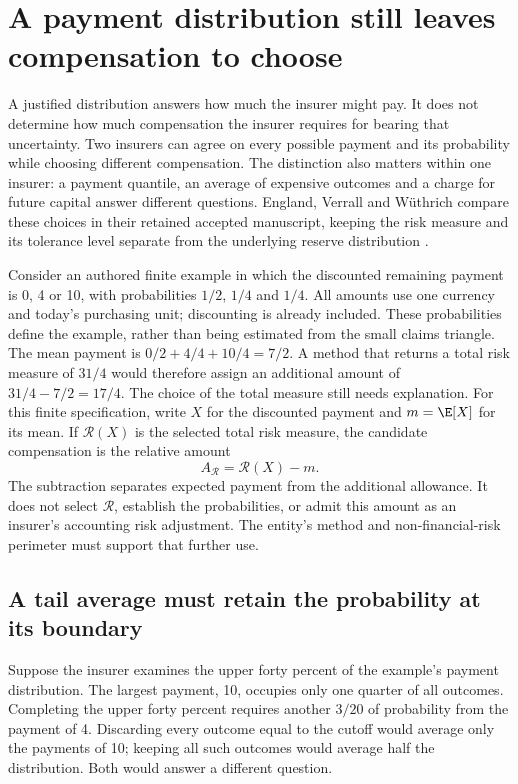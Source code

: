 \section{A payment distribution still leaves compensation to choose}
\label{sec:reserve-risk-measures}

A justified distribution answers how much the insurer might pay. It does not
determine how much compensation the insurer requires for bearing that
uncertainty. Two insurers can agree on every possible payment and its
probability while choosing different compensation. The distinction also
matters within one insurer: a payment quantile, an average of expensive
outcomes and a charge for future capital answer different questions.
England, Verrall and W\"uthrich compare these choices in their retained
accepted manuscript, keeping the risk measure and its tolerance level
separate from the underlying reserve distribution
\citep[Sections 5--6]{england2019lifetime}.

Consider an authored finite example in which the discounted remaining payment
is 0, 4 or 10, with probabilities $1/2$, $1/4$ and $1/4$. All amounts use one
currency and today's purchasing unit; discounting is already included. These
probabilities define the example, rather than being estimated from the small
claims triangle. The mean payment is $0/2+4/4+10/4=7/2$. A method that returns
a total risk measure of $31/4$ would therefore assign an additional amount
of $31/4-7/2=17/4$. The choice of the total measure still needs explanation.
For this finite specification, write $X$ for the discounted payment and
$m=\E[X]$ for its mean. If $\mathcal R(X)$ is the selected total risk measure,
the candidate compensation is the relative amount
\[
 A_{\mathcal R}=\mathcal R(X)-m.
\]
The subtraction separates expected payment from the additional allowance.
It does not select $\mathcal R$, establish the probabilities, or admit this
amount as an insurer's accounting risk adjustment. The entity's method and
non-financial-risk perimeter must support that further use.

\subsection{A tail average must retain the probability at its boundary}

Suppose the insurer examines the upper forty percent of the example's payment
distribution. The largest payment, 10, occupies only one quarter of all
outcomes. Completing the upper forty percent requires another $3/20$ of
probability from the payment of 4. Discarding every outcome equal to the
cutoff would average only the payments of 10; keeping all such outcomes would
average half the distribution. Both would answer a different question.


